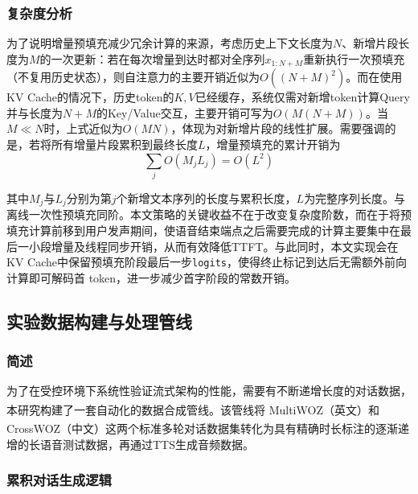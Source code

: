 \documentclass[UTF8,a4paper,zihao=5]{ctexart}
\newcommand{\upcite}[1]{\textsuperscript{\cite{#1}}}
\begin{document}
\subsubsection{复杂度分析}

为了说明增量预填充减少冗余计算的来源，考虑历史上下文长度为$N$、新增片段长度为$M$的一次更新：若在每次增量到达时都对全序列$x_{1:N+M}$重新执行一次预填充（不复用历史状态），则自注意力的主要开销近似为$O\!\left((N+M)^{2}\right)$。而在使用KV Cache的情况下，历史token的$K,V$已经缓存，系统仅需对新增token计算Query并与长度为$N+M$的Key/Value交互，主要开销可写为$O\!\left(M(N+M)\right)$。当$M\ll N$时，上式近似为$O(MN)$，体现为对新增片段的线性扩展。需要强调的是，若将所有增量片段累积到最终长度$L$，增量预填充的累计开销为
\begin{equation}
\sum_{j}O\!\left(M_j L_j\right)=O\!\left(L^{2}\right)
\end{equation}

其中$M_j$与$L_j$分别为第$j$个新增文本序列的长度与累积长度，$L$为完整序列长度。与离线一次性预填充同阶。本文策略的关键收益不在于改变复杂度阶数，而在于将预填充计算前移到用户发声期间，使语音结束端点之后需要完成的计算主要集中在最后一小段增量及线程同步开销，从而有效降低TTFT。与此同时，本文实现会在KV Cache中保留预填充阶段最后一步\texttt{logits}，使得终止标记到达后无需额外前向计算即可解码首 token，进一步减少首字阶段的常数开销。

\subsection{实验数据构建与处理管线}

\subsubsection{简述}

为了在受控环境下系统性验证流式架构的性能，需要有不断递增长度的对话数据，本研究构建了一套自动化的数据合成管线。该管线将 MultiWOZ（英文）\upcite{ref14}和 CrossWOZ（中文）\upcite{ref15}这两个标准多轮对话数据集转化为具有精确时长标注的逐渐递增的长语音测试数据，再通过TTS生成音频数据。

\subsubsection{累积对话生成逻辑}
\end{document}
